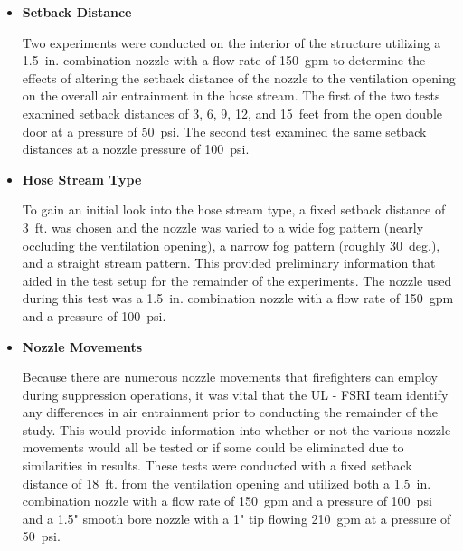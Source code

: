 \documentclass{article}
\begin{document}
\begin{itemize}

\item \bf{Setback Distance}
\normalfont
\vspace*{\baselineskip}

Two experiments were conducted on the interior of the structure utilizing a 1.5~in. combination nozzle with a flow rate of 150~gpm to determine the effects of altering the setback distance of the nozzle to the ventilation opening on the overall air entrainment in the hose stream. The first of the two tests examined setback distances of 3, 6, 9, 12, and 15~feet from the open double door at a pressure of 50~psi. The second test examined the same setback distances at a nozzle pressure of 100~psi.  

\vspace*{\baselineskip}

\item \bf{Hose Stream Type}
\normalfont
\vspace*{\baselineskip}

To gain an initial look into the hose stream type, a fixed setback distance of 3~ft. was chosen and the nozzle was varied to a wide fog pattern (nearly occluding the ventilation opening), a narrow fog pattern (roughly 30~deg.), and a straight stream pattern. This provided preliminary information that aided in the test setup for the remainder of the experiments. The nozzle used during this test was a 1.5~in. combination nozzle with a flow rate of 150~gpm and a pressure of 100~psi.

\vspace*{\baselineskip}

\item \bf{Nozzle Movements}
\normalfont
\vspace*{\baselineskip}

Because there are numerous nozzle movements that firefighters can employ during suppression operations, it was vital that the UL - FSRI team identify any differences in air entrainment prior to conducting the remainder of the study. This would provide information into whether or not the various nozzle movements would all be tested or if some could be eliminated due to similarities in results. These tests were conducted with a fixed setback distance of 18~ft. from the ventilation opening and utilized both a 1.5~in. combination nozzle with a flow rate of 150~gpm and a pressure of 100~psi and a 1.5" smooth bore nozzle with a 1" tip flowing 210~gpm at a pressure of 50~psi.


\end{itemize}
\end{document}
